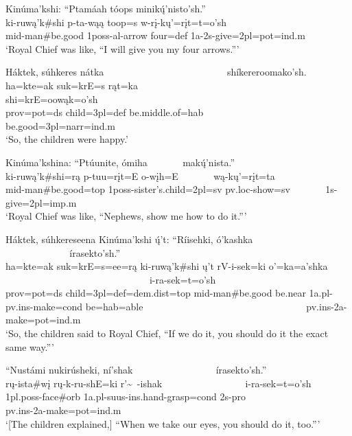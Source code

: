 \begin{exe}
\item\label{EJ24} \glll Kinúma'kshi: ``Ptamáah tóops minikų́'nisto'sh.''\\
ki-ruwą'k\#shi p-ta-wąą toop=s w-rį-kų'=rįt=t=o'sh\\
mid-\textnormal{man}\#\textnormal{be.good} 1poss-al-\textnormal{arrow} \textnormal{four}=def 1a-2s-\textnormal{give}=2pl=pot=ind.m\\
\glt `Royal Chief was like, ``I will give you my four arrows.{''}'

\item\label{EJ25} \glll Háktek, súhkeres nátka ~ ~ ~ ~ ~ ~ ~ ~ ~ ~ ~ ~ ~ ~ ~ shíkereroomako'sh.\\
ha=kte=ak suk=krE=s rąt=ka ~ ~ ~ ~ ~ ~ ~ ~ ~ ~ ~ ~ ~ ~ ~ shi=krE=oowąk=o'sh\\
prov=pot=ds \textnormal{child}=3pl=def \textnormal{be.middle.of}=hab ~ ~ ~ ~ ~ ~ ~ ~ ~ ~ ~ ~ ~ ~ ~ \textnormal{be.good}=3pl=narr=ind.m\\
\glt `So, the children were happy.'

\item\label{EJ26} \glll Kinúma'kshina: ``Ptúunite, ómiha ~ ~ ~ ~ makų́'nista.''\\
ki-ruwą'k\#shi=rą p-tuu=rįt=E o-wįh=E ~ ~ ~ ~ wą-kų'=rįt=ta\\
mid-\textnormal{man}\#\textnormal{be.good}=top 1poss-\textnormal{sister's.child}=2pl=sv pv.loc-\textnormal{show}=sv ~ ~ ~ ~ 1s-\textnormal{give}=2pl=imp.m\\
\glt `Royal Chief was like, ``Nephews, show me how to do it.{''}'

\item\label{EJ27} \glll Háktek, súhkereseena Kinúma'kshi ų́'t: ``Ríisehki, ó'kashka ~ ~ ~ ~ ~ ~ ~ ~ ~ ~ ~ ~ ~ ~ ~ ~ ~ ~ ~ ~ írasekto'sh.''\\
ha=kte=ak suk=krE=s=ee=rą ki-ruwą'k\#shi ų't rV-i-sek=ki o'=ka=a'shka ~ ~ ~ ~ ~ ~ ~ ~ ~ ~ ~ ~ ~ ~ ~ ~ ~ ~ ~ ~ i-ra-sek=t=o'sh\\
prov=pot=ds \textnormal{child}=3pl=def=dem.dist=top mid-\textnormal{man}\#\textnormal{be.good} \textnormal{be.near} 1a.pl-pv.ins-\textnormal{make}=cond \textnormal{be}=hab=able ~ ~ ~ ~ ~ ~ ~ ~ ~ ~ ~ ~ ~ ~ ~ ~ ~ ~ ~ ~ pv.ins-2a-\textnormal{make}=pot=ind.m\\
\glt `So, the children said to Royal Chief, ``If we do it, you should do it the exact same way.{''}'

\item\label{EJ28} \glll ``Nustámi nukirúsheki, ní'shak ~ ~ ~ ~ ~ ~ ~ ~ ~ ~ írasekto'sh.{''}\\
rų-ista\#wį rų-k-ru-shE=ki r'\~~-ishak ~ ~ ~ ~ ~ ~ ~ ~ ~ ~ i-ra-sek=t=o'sh\\
1pl.poss-\textnormal{face}\#\textnormal{orb} 1a.pl-suus-ins.hand-\textnormal{grasp}=cond 2s-pro ~ ~ ~ ~ ~ ~ ~ ~ ~ ~ pv.ins-2a-\textnormal{make}=pot=ind.m\\
\glt `[The children explained,] ``When we take our eyes, you should do it, too.{''}'


\end{exe}
